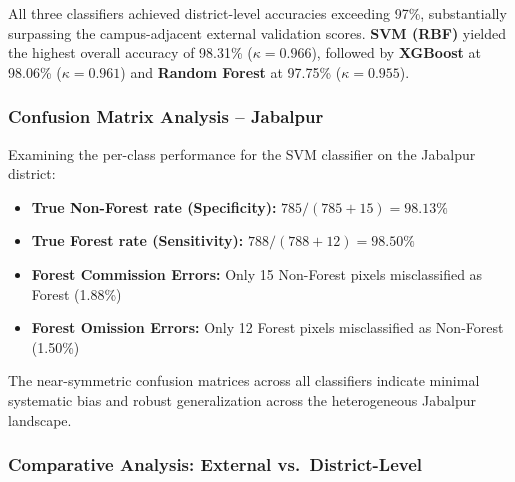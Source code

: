 \documentclass[12pt, a4paper, twocolumn]{article}
\begin{document}
\begin{table}[H]
\centering
\caption{Jabalpur district-level validation results (800 per class, $N = 1{,}600$).}
\label{tab:jbp_results}
\end{table}

All three classifiers achieved district-level accuracies exceeding 97\%, substantially surpassing the campus-adjacent external validation scores. \textbf{SVM (RBF)} yielded the highest overall accuracy of 98.31\% ($\kappa = 0.966$), followed by \textbf{XGBoost} at 98.06\% ($\kappa = 0.961$) and \textbf{Random Forest} at 97.75\% ($\kappa = 0.955$).

\subsubsection{Confusion Matrix Analysis -- Jabalpur}

Examining the per-class performance for the SVM classifier on the Jabalpur district:

\begin{itemize}
    \item \textbf{True Non-Forest rate (Specificity):} $785 / (785 + 15) = 98.13\%$
    \item \textbf{True Forest rate (Sensitivity):} $788 / (788 + 12) = 98.50\%$
    \item \textbf{Forest Commission Errors:} Only 15 Non-Forest pixels misclassified as Forest (1.88\%)
    \item \textbf{Forest Omission Errors:} Only 12 Forest pixels misclassified as Non-Forest (1.50\%)
\end{itemize}

The near-symmetric confusion matrices across all classifiers indicate minimal systematic bias and robust generalization across the heterogeneous Jabalpur landscape.

\subsubsection{Comparative Analysis: External vs.\ District-Level}
\end{document}
